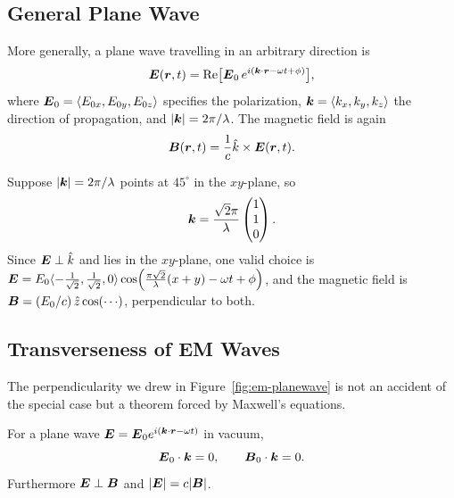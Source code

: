 \subsection{General Plane Wave}

More generally, a plane wave travelling in an arbitrary direction is
\begin{equation}
    \vect{E}(\lvect{r},t) = \operatorname{Re}\bigl[\vect{E}_0\, e^{i(\lvect{k}\cdot\lvect{r} - \omega t + \phi)}\bigr],
\end{equation}
where $\vect{E}_0 = \langle E_{0x}, E_{0y}, E_{0z}\rangle$ specifies the polarization, $\bm{k} = \langle k_x, k_y, k_z\rangle$ the direction of propagation, and $|\bm{k}| = 2\pi/\lambda$. The magnetic field is again
\begin{equation}
    \vect{B}(\lvect{r},t) = \frac{1}{c}\hat{k}\times \vect{E}(\lvect{r},t).
\end{equation}

\begin{example}
Suppose $|\bm{k}| = 2\pi/\lambda$ points at $45^\circ$ in the $xy$-plane, so
\begin{equation}
    \bm{k} = \frac{\sqrt{2}\pi}{\lambda}\begin{pmatrix}1\\1\\0\end{pmatrix}.
\end{equation}
Since $\vect{E}\perp\hat{k}$ and lies in the $xy$-plane, one valid choice is $\vect{E} = E_0\langle -\tfrac{1}{\sqrt 2}, \tfrac{1}{\sqrt 2}, 0\rangle\cos\!\left(\tfrac{\pi\sqrt 2}{\lambda}(x+y) - \omega t + \phi\right)$, and the magnetic field is $\vect{B} = (E_0/c)\,\hat{z}\cos(\cdots)$, perpendicular to both.
\end{example}

\subsection{Transverseness of EM Waves}

The perpendicularity we drew in Figure~\ref{fig:em-planewave} is not an accident of the special case but a theorem forced by Maxwell's equations.

\begin{theorem}[Transverseness]
For a plane wave $\vect{E} = \vect{E}_0 e^{i(\lvect{k}\cdot\lvect{r} - \omega t)}$ in vacuum,
\begin{equation}
    \vect{E}_0\cdot\lvect{k} = 0, \qquad \vect{B}_0\cdot\lvect{k} = 0.
\end{equation}
Furthermore $\vect{E}\perp\vect{B}$ and $|\vect{E}| = c|\vect{B}|$.
\end{theorem}

